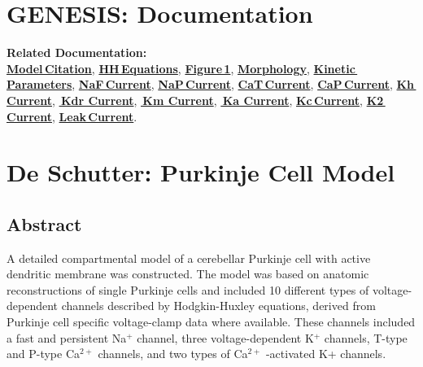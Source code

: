 \documentclass[12pt]{article}
\begin{document}
\section*{GENESIS: Documentation}

{\bf Related Documentation:}\\
\href{../pub-purkinje-deschutter1-citation/pub-purkinje-deschutter1-citation.tex}{\bf Model\,Citation}, 
\href{../pub-purkinje-deschutter1-equations1/pub-purkinje-deschutter1-equations1.tex}{\bf HH\,Equations},
\href{../pub-purkinje-deschutter1-fig1/pub-purkinje-deschutter1-fig1.tex}{\bf Figure\,1},
\href{../pub-purkinje-deschutter1-morphology/pub-purkinje-deschutter1-morphology.tex}{\bf Morphology},
\href{../pub-purkinje-deschutter1-table1/pub-purkinje-deschutter1-table1.tex}{\bf Kinetic\,Parameters},
\href{../pub-purkinje-deschutter1-conductance1-naf1/pub-purkinje-deschutter1-conductance1-naf1.tex}{\bf NaF\,Current},
\href{../pub-purkinje-deschutter1-conductance1-nap1/pub-purkinje-deschutter1-conductance1-nap1.tex}{\bf NaP\,Current},
\href{../pub-purkinje-deschutter1-conductance1-cat1/pub-purkinje-deschutter1-conductance1-cat1.tex}{\bf CaT\,Current},
\href{../pub-purkinje-deschutter1-conductance1-cap1/pub-purkinje-deschutter1-conductance1-cap1.tex}{\bf CaP\,Current},
\href{../pub-purkinje-deschutter1-conductance1-kh1/pub-purkinje-deschutter1-conductance1-kh1.tex}{\bf Kh\,Current},
\href{../pub-purkinje-deschutter1-conductance1-kdr1/pub-purkinje-deschutter1-conductance1-kdr1.tex}{\bf\,Kdr Current},
\href{../pub-purkinje-deschutter1-conductance1-km1/pub-purkinje-deschutter1-conductance1-km1.tex}{\bf\,Km Current},
\href{../pub-purkinje-deschutter1-conductance1-ka1/pub-purkinje-deschutter1-conductance1-ka1.tex}{\bf\,Ka Current},
\href{../pub-purkinje-deschutter1-conductance1-kc1/pub-purkinje-deschutter1-conductance1-kc1.tex}{\bf Kc\,Current},
\href{../pub-purkinje-deschutter1-conductance1-k2/pub-purkinje-deschutter1-conductance1-k2.tex}{\bf K2\,Current},
\href{../pub-purkinje-deschutter1-conductance1-leak1/pub-purkinje-deschutter1-conductance1-leak1.tex}{\bf Leak\,Current}.

\section*{De Schutter: Purkinje Cell Model}

\subsection*{Abstract}

A detailed compartmental model of a cerebellar Purkinje
cell with active dendritic membrane was constructed. The model
was based on anatomic reconstructions of single Purkinje cells and
included 10 different types of voltage-dependent channels described
by Hodgkin-Huxley equations, derived from Purkinje cell specific
voltage-clamp data where available. These channels included
a fast and persistent Na$^+$ channel, three voltage-dependent
K$^+$ channels, T-type and P-type Ca$^{2+}$ channels, and two types of
Ca$^{2+}$ -activated K+ channels.
\end{document}
